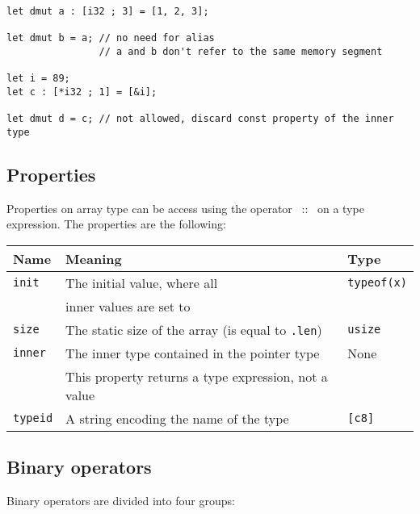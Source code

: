 \begin{lstlisting}[style=coloredverbatim]
let dmut a : [i32 ; 3] = [1, 2, 3];

let dmut b = a; // no need for alias
                // a and b don't refer to the same memory segment

let i = 89;
let c : [*i32 ; 1] = [&i];

let dmut d = c; // not allowed, discard const property of the inner type
\end{lstlisting}



\subsection {Properties}

Properties on array type can be access using the operator ~::~ on a type
expression. The properties are the following:

\vspace{-20pt}%
\begin{center}\begin{adjustbox}{max width=\linewidth}
  \begin{tabular}{|l|ll|}
    \hline
    Name & Meaning & Type\\
    \hline
    \hline
    \texttt{init} & The initial value, where all & \texttt{typeof(x)} \\
    & inner values are set to  & \\
    \Xhline{0.001pt}
    \texttt{size} & The static size of the array (is equal to \texttt{.len}) & \texttt{usize} \\
    \Xhline{0.001pt}
    \texttt{inner} & The inner type contained in the pointer type & None\\
    & This property returns a type expression, not a value &\\
    \hline
    \texttt{typeid} & A string encoding the name of the type & \texttt{[c8]} \\
    \hline
  \end{tabular}
\end{adjustbox}\end{center}

\subsection {Binary operators}

Binary operators are divided into four groups:

